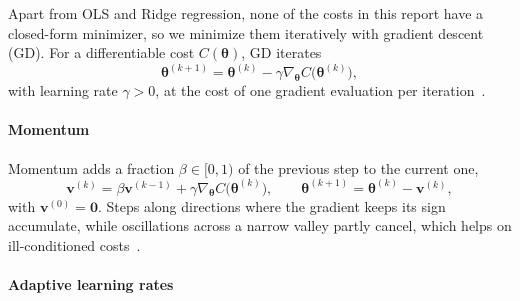 Apart from OLS and Ridge regression, none of the costs in this report have a
closed-form minimizer, so we minimize them iteratively with gradient descent (GD).
For a differentiable cost $C(\bm{\theta})$, GD iterates
\begin{equation}\label{eq:gd-basic}
    \bm{\theta}^{(k+1)} = \bm{\theta}^{(k)} - \gamma
    \nabla_{\bm{\theta}} C\big(\bm{\theta}^{(k)}\big),
\end{equation}
with learning rate $\gamma > 0$, at the cost of one gradient evaluation per
iteration~\cite{hjorth-jensen_2026}.

\paragraph{Momentum}

Momentum adds a fraction $\beta \in [0, 1)$ of the previous step to the current one,
\begin{equation}\label{eq:gd-momentum}
    \bm{v}^{(k)} = \beta\bm{v}^{(k-1)} + \gamma\nabla_{\bm{\theta}}
    C\big(\bm{\theta}^{(k)}\big), \qquad
    \bm{\theta}^{(k+1)} = \bm{\theta}^{(k)} - \bm{v}^{(k)},
\end{equation}
with $\bm{v}^{(0)} = \bm{0}$. Steps along directions where the gradient keeps its sign
accumulate, while oscillations across a narrow valley partly cancel, which helps on
ill-conditioned costs~\cite{goodfellow_2016,hjorth-jensen_2026}.

\paragraph{Adaptive learning rates}

